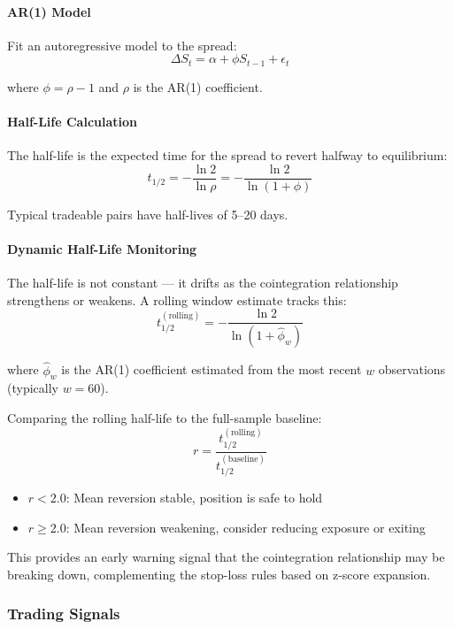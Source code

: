 \paragraph{AR(1) Model}

Fit an autoregressive model to the spread:
\[
\Delta S_t = \alpha + \phi S_{t-1} + \epsilon_t
\]

where $\phi = \rho - 1$ and $\rho$ is the AR(1) coefficient.

\paragraph{Half-Life Calculation}

The half-life is the expected time for the spread to revert halfway to equilibrium:
\[
t_{1/2} = -\frac{\ln 2}{\ln \rho} = -\frac{\ln 2}{\ln(1 + \phi)}
\]

Typical tradeable pairs have half-lives of 5--20 days.

\paragraph{Dynamic Half-Life Monitoring}

The half-life is not constant --- it drifts as the cointegration relationship strengthens or weakens. A rolling window estimate tracks this:
\[
t_{1/2}^{(\text{rolling})} = -\frac{\ln 2}{\ln(1 + \hat{\phi}_w)}
\]

where $\hat{\phi}_w$ is the AR(1) coefficient estimated from the most recent $w$ observations (typically $w = 60$).

Comparing the rolling half-life to the full-sample baseline:
\[
r = \frac{t_{1/2}^{(\text{rolling})}}{t_{1/2}^{(\text{baseline})}}
\]

\begin{itemize}
  \item $r < 2.0$: Mean reversion stable, position is safe to hold
  \item $r \geq 2.0$: Mean reversion weakening, consider reducing exposure or exiting
\end{itemize}

This provides an early warning signal that the cointegration relationship may be breaking down, complementing the stop-loss rules based on z-score expansion.

\subsubsection{Trading Signals}

